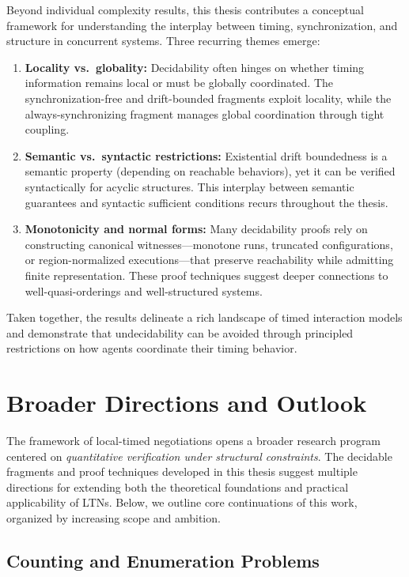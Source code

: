 Beyond individual complexity results, this thesis contributes a conceptual framework for understanding the interplay between timing, synchronization, and structure in concurrent systems. Three recurring themes emerge:

\begin{enumerate}
\item \textbf{Locality vs.\ globality:} Decidability often hinges on whether timing information remains local or must be globally coordinated. The synchronization-free and drift-bounded fragments exploit locality, while the always-synchronizing fragment manages global coordination through tight coupling.

\item \textbf{Semantic vs.\ syntactic restrictions:} Existential drift boundedness is a semantic property (depending on reachable behaviors), yet it can be verified syntactically for acyclic structures. This interplay between semantic guarantees and syntactic sufficient conditions recurs throughout the thesis.

\item \textbf{Monotonicity and normal forms:} Many decidability proofs rely on constructing canonical witnesses—monotone runs, truncated configurations, or region-normalized executions—that preserve reachability while admitting finite representation. These proof techniques suggest deeper connections to well-quasi-orderings and well-structured systems.
\end{enumerate}

Taken together, the results delineate a rich landscape of timed interaction models and demonstrate that undecidability can be avoided through principled restrictions on how agents coordinate their timing behavior.

\section{Broader Directions and Outlook}
\label{sec:future-directions}

The framework of local-timed negotiations opens a broader research program centered on \emph{quantitative verification under structural constraints}. The decidable fragments and proof techniques developed in this thesis suggest multiple directions for extending both the theoretical foundations and practical applicability of LTNs. Below, we outline core continuations of this work, organized by increasing scope and ambition.

\subsection{Counting and Enumeration Problems}

